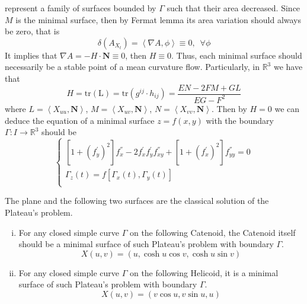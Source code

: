 represent a family of surfaces bounded by $\Gamma$ such that their area decreased. Since $M$ is the minimal surface, then by Fermat lemma its area variation should always be zero, that is
\begin{equation*}
    \delta(A_{X_t})=\left<\nabla A,\phi\right>\equiv 0,\,\,\, \forall\phi
\end{equation*}
It implies that $\nabla A=-H\cdot\mathbf{N}\equiv 0$, then $H\equiv 0$. Thus, each minimal surface should necessarily be a stable point of a mean curvature flow. Particularly, in $\mathbb{R}^3$ we have that
\begin{equation*}
    H=\mathrm{tr}(\mathrm{L})=\mathrm{tr}(g^{ij}\cdot h_{ij})=\frac{EN-2FM+GL}{EG-F^2}
\end{equation*}
where $L=\left<X_{uu},\mathbf{N}\right>$, $M=\left<X_{uv},\mathbf{N}\right>$, $N=\left<X_{vv},\mathbf{N}\right>$. Then by $H=0$ we can deduce the equation of a minimal surface $z=f(x,y)$ with the boundary $\Gamma: I\to\mathbb{R}^3$ should be
\begin{equation}\label{eq:M-1-1}
    \begin{cases}
        {\left[1+{(f^\prime_y)}^2\right]}f_{x}^{''}-2f^\prime_x f^\prime_y f^{''}_{xy}+{\left[1+{(f^\prime_x)}^2\right]}f^{''}_{yy}=0\\
        \Gamma_z(t)=f\left[\Gamma_x(t),\Gamma_y(t)\right]\\
    \end{cases}
\end{equation}

\begin{example}\label{exam:M-1-1}
    The plane and the following two surfaces are the classical solution of the Plateau's problem.
    \begin{enumerate}[(i)]
        \item For any closed simple curve $\Gamma$ on the following Catenoid, the Catenoid itself should be a minimal surface of such Plateau's problem with boundary $\Gamma$.
        \begin{equation}\label{eq:M-1-2}
            X(u,v)=\left(u,\cosh{u}\cos{v},\cosh{u}\sin{v}\right)
        \end{equation}
        \item For any closed simple curve $\Gamma$ on the following Helicoid, it is a minimal surface of such Plateau's problem with boundary $\Gamma$.
        \begin{equation}\label{eq:M-1-3}
            X(u,v)=\left(v\cos{u},v\sin{u},u\right)
        \end{equation}
    \end{enumerate}
\end{example}

